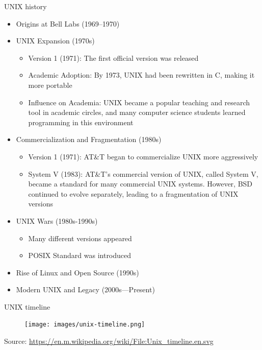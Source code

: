 \documentclass{beamer}
\begin{document}
\begin{frame}{UNIX history}
  \begin{itemize}
    \item Origins at Bell Labs (1969--1970)
    \item UNIX Expansion (1970s)
    \begin{itemize}
      \footnotesize
      \item Version 1 (1971): The first official version was released
      \item Academic Adoption: By 1973, UNIX had been rewritten in C, making it more portable
      \item Influence on Academia: UNIX became a popular teaching and research tool in academic circles, and many computer science students learned programming in this environment
    \end{itemize}
    \item Commercialization and Fragmentation (1980s)
    \begin{itemize}
      \footnotesize
      \item Version 1 (1971): AT\&T began to commercialize UNIX more aggressively
      \item System V (1983): AT\&T's commercial version of UNIX, called System V, became a standard for many commercial UNIX systems. However, BSD continued to evolve separately, leading to a fragmentation of UNIX versions
    \end{itemize}
    \item UNIX Wars (1980s-1990s)
    \begin{itemize}
      \footnotesize
      \item Many different versions appeared
      \item POSIX Standard was introduced
    \end{itemize}
    \item Rise of Linux and Open Source (1990s)
    \item Modern UNIX and Legacy (2000s---Present)
  \end{itemize}
\end{frame}

\begin{frame}{UNIX timeline}
  \begin{figure}[h]
    \texttt{[image: images/unix-timeline.png]}
  \end{figure}

  \footnotesize Source: \href{https://en.m.wikipedia.org/wiki/File:Unix_timeline.en.svg}{https://en.m.wikipedia.org/wiki/File:Unix\_timeline.en.svg}
\end{frame}
\end{document}
